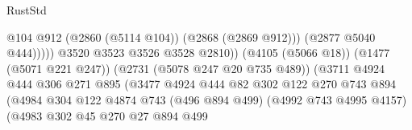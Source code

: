 \begin{lexlean}{RustStd}
\begin{coremodule}
                                                              @104
                                                              @912
                                                              (@2860 (@5114 @104))
                                                              (@2868 (@2869 @912)))
                                                            (@2877 @5040 @444)))))
                                                    @3520
                                                    @3523
                                                    @3526
                                                    @3528
                                                    @2810))
                                                (@4105 (@5066 @18))
                                                (@1477 (@5071 @221 @247))
                                                (@2731 (@5078 @247 @20 @735 @489))
                                                (@3711
                                                  @4924
                                                  @444
                                                  @306
                                                  @271
                                                  @895
                                                  (@3477
                                                    @4924
                                                    @444
                                                    @82
                                                    @302
                                                    @122
                                                    @270
                                                    @743
                                                    @894
                                                    (@4984
                                                      @304
                                                      @122
                                                      @4874
                                                      @743
                                                      (@496 @894 @499)
                                                      (@4992 @743 @4995 @4157)
                                                      (@4983
                                                        @302
                                                        @45
                                                        @270
                                                        @27
                                                        @894
                                                        @499

\end{coremodule}
\end{lexlean}
